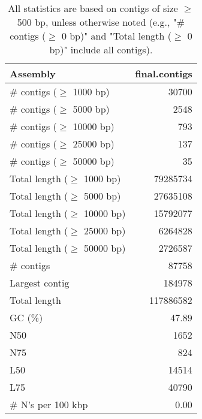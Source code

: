 \documentclass[12pt,a4paper]{article}
\begin{document}
\begin{table}[ht]
\begin{center}
\caption{All statistics are based on contigs of size $\geq$ 500 bp, unless otherwise noted (e.g., "\# contigs ($\geq$ 0 bp)" and "Total length ($\geq$ 0 bp)" include all contigs).}
\begin{tabular}{|l*{1}{|r}|}
\hline
Assembly & final.contigs \\ \hline
\# contigs ($\geq$ 1000 bp) & 30700 \\ \hline
\# contigs ($\geq$ 5000 bp) & 2548 \\ \hline
\# contigs ($\geq$ 10000 bp) & 793 \\ \hline
\# contigs ($\geq$ 25000 bp) & 137 \\ \hline
\# contigs ($\geq$ 50000 bp) & 35 \\ \hline
Total length ($\geq$ 1000 bp) & 79285734 \\ \hline
Total length ($\geq$ 5000 bp) & 27635108 \\ \hline
Total length ($\geq$ 10000 bp) & 15792077 \\ \hline
Total length ($\geq$ 25000 bp) & 6264828 \\ \hline
Total length ($\geq$ 50000 bp) & 2726587 \\ \hline
\# contigs & 87758 \\ \hline
Largest contig & 184978 \\ \hline
Total length & 117886582 \\ \hline
GC (\%) & 47.89 \\ \hline
N50 & 1652 \\ \hline
N75 & 824 \\ \hline
L50 & 14514 \\ \hline
L75 & 40790 \\ \hline
\# N's per 100 kbp & 0.00 \\ \hline
\end{tabular}
\end{center}
\end{table}
\end{document}
